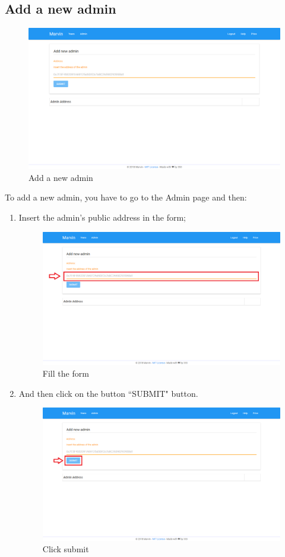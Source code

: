 \documentclass[ManualeUtente]{subfiles}
\begin{document}
	\subsection{Add a new admin}
	\begin{figure}[H]
		\centering
		\includegraphics[width=0.7\linewidth]{image/UniversityAddAmin}
		\caption[Add admin]{Add a new admin}
		\label{fig:Add a new admin}
	\end{figure}\newpage
	To add a new admin, you have to go to the Admin page and then:
	\begin{enumerate}
		\item Insert the admin's public address in the form;
		\begin{figure}[H]
			\centering
			\includegraphics[width=0.7\linewidth]{image/UniversityAddAmin1}
			\caption[Add admin form]{Fill the form}
			\label{fig:Add a new admin, fill the form}
		\end{figure}
		\item And then click on the button ``SUBMIT" button.
		\begin{figure}[H]
			\centering
			\includegraphics[width=0.7\linewidth]{image/UniversityAddAmin2}
			\caption[Add admin submit]{Click submit}
			\label{fig:Add a new admin, click submit}
		\end{figure}
	\end{enumerate}
	\newpage
\end{document}
